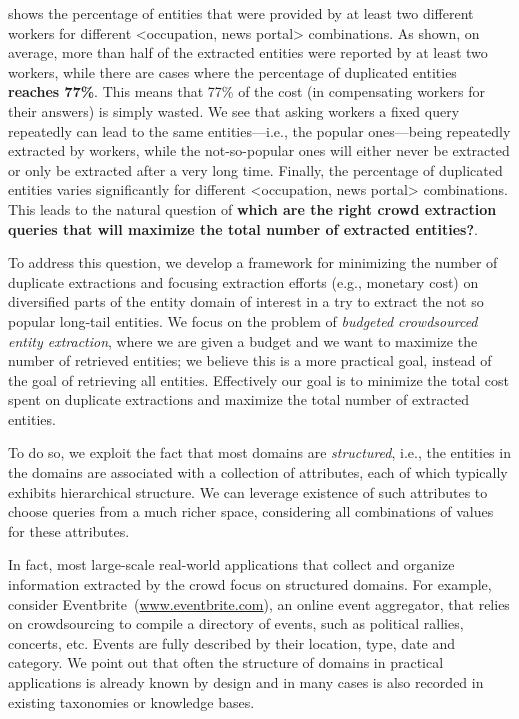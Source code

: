  shows the percentage of entities that were provided by at least two different workers for different <occupation, news portal> combinations. As shown, on average, more than half of the extracted entities were reported by at least two workers, while there are cases where the percentage of duplicated entities {\bf reaches 77\%}. This means that 77\% of the cost (in compensating workers for their answers) is simply wasted. We see that asking workers a fixed query repeatedly can lead to the same entities---i.e., the popular ones---being repeatedly extracted by workers, while the not-so-popular ones will either never be extracted or only be extracted after a very long time. Finally, the percentage of duplicated entities varies significantly for different <occupation, news portal> combinations. This leads to the natural question of {\bf which are the right crowd extraction queries that will maximize the total number of extracted entities?}. 

To address this question, we develop a framework for minimizing the number of duplicate extractions and focusing extraction efforts (e.g., monetary cost) on diversified parts of the entity domain of interest in a try to extract the not so popular long-tail entities. We focus on the problem of {\em budgeted crowdsourced entity extraction}, where we are given a budget and we want to maximize the number of retrieved entities; we believe this is a more practical goal, instead of the goal of retrieving all entities.  Effectively our goal is to minimize the total cost spent on duplicate extractions and maximize the total number of extracted entities. 

To do so, we exploit the fact that most domains are {\em structured}, i.e., the entities in the domains are associated with a collection of attributes, each of which typically exhibits hierarchical structure. We can leverage existence of such attributes to choose queries from a much richer space, considering all combinations of values for these attributes.

In fact, most large-scale real-world applications that collect and organize information extracted by the crowd focus on structured domains. For example, consider Eventbrite~(\url{www.eventbrite.com}), an online event aggregator, that relies on crowdsourcing to compile a directory of events, such as political rallies, concerts, etc. Events are fully described by their location, type, date and category. We point out that often the structure of domains in practical applications is already known by design and in many cases is also recorded in existing taxonomies or knowledge bases. 

